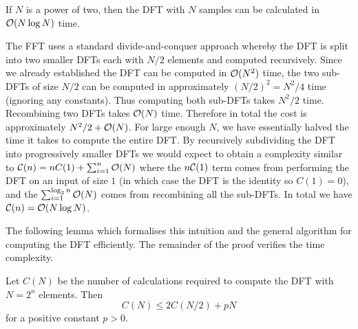 \begin{theorem}\label{thm:fft}
    If $N$ is a power of two, then the DFT with $N$ samples can be calculated in $\mathcal O(N\log N)$ time.
\end{theorem}

The FFT uses a standard divide-and-conquer approach whereby the DFT is split into two smaller DFTs each with $N/2$ elements and computed recursively. Since we already established the DFT can be computed in $\mathcal O(N^2)$ time, the two sub-DFTs of size $N/2$ can be computed in approximately $(N/2)^2 = N^2/4$ time (ignoring any constants). Thus computing both sub-DFTs takes $N^2 / 2$ time.\\
Recombining two DFTs takes $\mathcal O(N)$ time. Therefore in total the cost is approximately $N^2/2 + \mathcal O(N)$. For large enough $N$, we have essentially halved the time it takes to compute the entire DFT. By recursively subdividing the DFT into progressively smaller DFTs we would expect to obtain a complexity similar to $\mathcal C(n) = nC(1) + \sum^n_{i=1} \mathcal O(N)$ where the $n\mathcal C(1)$ term comes from performing the DFT on an input of size $1$ (in which case the DFT is the identity so $C(1) = 0$), and the $\sum^{\log_2 n}_{i=1} \mathcal O(N)$ comes from recombining all the sub-DFTs. In total we have $\mathcal C(n) = \mathcal O(N \log N)$.

The following lemma which formalises this intuition and the general algorithm for computing the DFT efficiently. The remainder of the proof verifies the time complexity.

\begin{lemma}
    Let $C(N)$ be the number of calculations required to compute the DFT with $N = 2^n$ elements. Then
    \begin{equation}
        C(N) \le 2 C(N/2) + pN \label{eq:fftlem}
    \end{equation}
    for a positive constant $p > 0$.
\end{lemma}

